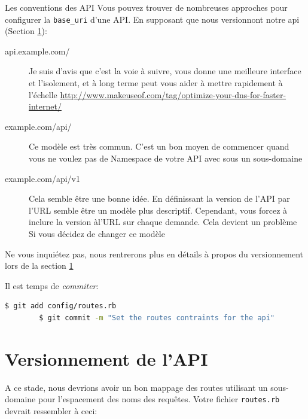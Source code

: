 \documentclass[]{report}
\begin{document}
      \begin{tcolorbox}{Les conventions des API}\label{box:setup_api}
        Vous pouvez trouver de nombreuses approches pour configurer la \verb|base_uri| d'une API. En supposant que nous versionnont notre api (Section \ref{section:api_versioning}):

        \begin{description}
          \item[api.example.com/] Je suis d'avis que c'est la voie à suivre, vous donne une meilleure interface et l'isolement, et à long terme peut vous aider à mettre rapidement à l'échelle \url{http://www.makeuseof.com/tag/optimize-your-dns-for-faster-internet/}
          \item[example.com/api/] Ce modèle est très commun. C'est un bon moyen de commencer quand vous ne voulez pas de Namespace de votre API avec sous un sous-domaine
          \item[example.com/api/v1] Cela semble être une bonne idée. En définissant la version de l'API par l'URL semble être un modèle plus descriptif. Cependant, vous forcez à inclure la version àl'URL sur chaque demande. Cela devient un problème Si vous décidez de changer ce modèle
        \end{description}

        Ne vous inquiétez pas, nous rentrerons plus en détails à propos du versionnement lors de la section \ref{section:api_versioning}

      \end{tcolorbox}

      Il est temps de \textit{commiter}:

      \begin{scriptsize}
        \begin{lstlisting}[language=bash]
        $ git add config/routes.rb
        $ git commit -m "Set the routes contraints for the api"
        \end{lstlisting}
      \end{scriptsize}

  \section{Versionnement de l'API}\label{section:api_versioning}

    A ce stade, nous devrions avoir un bon mappage des routes utilisant un sous-domaine pour l'espacement des noms des requêtes. Votre fichier \verb|routes.rb| devrait ressembler à ceci:
\end{document}
